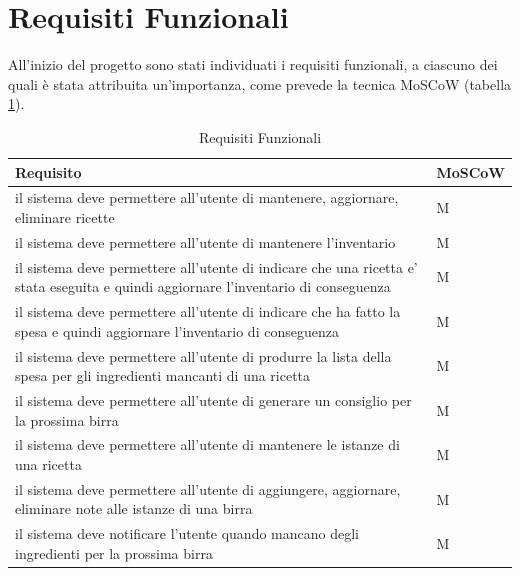 \documentclass[a4paper,12pt]{report}
\begin{document}
	\section{Requisiti Funzionali}
	All'inizio del progetto sono stati individuati i requisiti funzionali, a ciascuno dei quali è stata attribuita un'importanza, come prevede la tecnica MoSCoW (tabella \ref{tab:Requisiti-Funzionali}).
    		\begin{table}[!h]
      			\renewcommand{\arraystretch}{1.2}
      			\begin{tabular}{p{}|p{}} 
        				\textbf{Requisito}  & \textbf{MoSCoW} \\
    				\hline
                                  il sistema deve permettere all'utente di mantenere, aggiornare, eliminare ricette & M \\
                                  il sistema deve permettere all'utente di mantenere l'inventario & M \\
                                  il sistema deve permettere all'utente di indicare che una ricetta e' stata eseguita e quindi aggiornare l'inventario di conseguenza & M \\
                                  il sistema deve permettere all'utente di indicare che ha fatto la spesa e quindi aggiornare l'inventario di conseguenza & M \\
                                  il sistema deve permettere all'utente di produrre la lista della spesa per gli ingredienti mancanti di una ricetta & M \\
                                  il sistema deve permettere all'utente di generare un consiglio per la prossima birra & M \\
                                  il sistema deve permettere all'utente di mantenere le istanze di una ricetta & M \\
                                  il sistema deve permettere all'utente di aggiungere, aggiornare, eliminare note alle istanze di una birra & M \\
                                  il sistema deve notificare l'utente quando mancano degli ingredienti per la prossima birra & M \\
        			\end{tabular}
        			\caption{Requisiti Funzionali}
      			\label{tab:Requisiti-Funzionali}
    		\end{table}

\newpage
\end{document}
